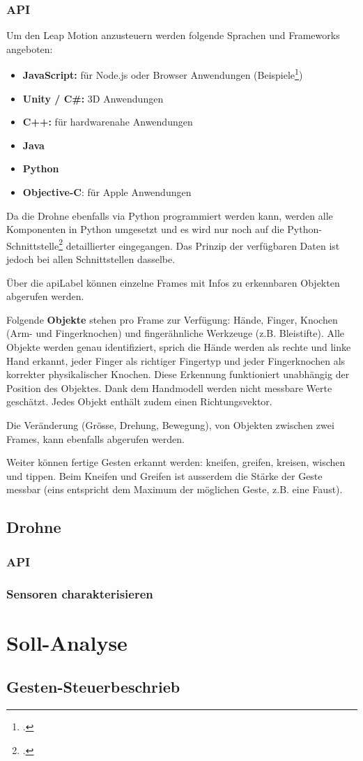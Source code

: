 \subsubsection{API}
Um den Leap Motion anzusteuern werden folgende Sprachen und Frameworks angeboten:
\begin{itemize}
	\item \textbf{JavaScript:} für Node.js oder Browser Anwendungen (Beispiele\footcite{Getting_Started_Leap_Motion_Developers_2015-03-28})
	\item \textbf{Unity / C\#:} 3D Anwendungen
	\item \textbf{C++:} für hardwarenahe Anwendungen
	\item \textbf{Java}
	\item \textbf{Python}
	\item \textbf{Objective-C}: für Apple Anwendungen
\end{itemize}

Da die Drohne ebenfalls via Python programmiert werden kann, werden alle Komponenten in Python umgesetzt und es wird nur noch auf die Python-Schnittstelle\footcite{Python_SDK_Documentation__Leap_Motion_Python_SDK_v2.2_documentation_2015-03-28} detaillierter eingegangen. Das Prinzip der verfügbaren Daten ist jedoch bei allen Schnittstellen dasselbe.

Über die \gls{apiLabel} können einzelne Frames mit Infos zu erkennbaren Objekten abgerufen werden.

Folgende \textbf{Objekte} stehen pro Frame zur Verfügung: Hände, Finger, Knochen (Arm- und Fingerknochen) und fingerähnliche Werkzeuge (z.B. Bleistifte).
Alle Objekte werden genau identifiziert, sprich die Hände werden als rechte und linke Hand erkannt, jeder Finger als richtiger Fingertyp und jeder Fingerknochen als korrekter physikalischer Knochen. Diese Erkennung funktioniert unabhängig der Position des Objektes. Dank dem Handmodell werden nicht messbare Werte geschätzt.
Jedes Objekt enthält zudem einen Richtungsvektor.

Die Veränderung (Grösse, Drehung, Bewegung), von Objekten zwischen zwei Frames, kann ebenfalls abgerufen werden.

Weiter können fertige Gesten erkannt werden: kneifen, greifen, kreisen, wischen und tippen.
Beim Kneifen und Greifen ist ausserdem die Stärke der Geste messbar (eins entspricht dem Maximum der möglichen Geste, z.B. eine Faust).

\subsection{Drohne}

\subsubsection{API}

\subsubsection{Sensoren charakterisieren}



\section{Soll-Analyse}
\subsection{Gesten-Steuerbeschrieb}


